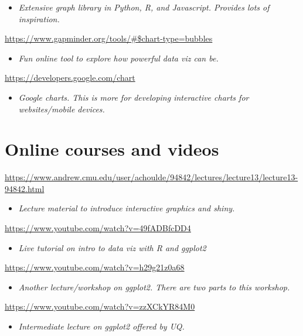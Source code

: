 \documentclass[
]{book}
\providecommand{\tightlist}{%
  \setlength{\itemsep}{0pt}\setlength{\parskip}{0pt}}
\begin{document}
\begin{itemize}
\tightlist
\item
  \emph{Extensive graph library in Python, R, and Javascript. Provides lots of inspiration.}
\end{itemize}

\url{https://www.gapminder.org/tools/\#$chart-type=bubbles}

\begin{itemize}
\tightlist
\item
  \emph{Fun online tool to explore how powerful data viz can be.}
\end{itemize}

\url{https://developers.google.com/chart}

\begin{itemize}
\tightlist
\item
  \emph{Google charts. This is more for developing interactive charts for websites/mobile devices.}
\end{itemize}

\section{Online courses and videos}\label{online-courses-and-videos}

\url{https://www.andrew.cmu.edu/user/achoulde/94842/lectures/lecture13/lecture13-94842.html}

\begin{itemize}
\tightlist
\item
  \emph{Lecture material to introduce interactive graphics and shiny.}
\end{itemize}

\url{https://www.youtube.com/watch?v=49fADBfcDD4}

\begin{itemize}
\tightlist
\item
  \emph{Live tutorial on intro to data viz with R and ggplot2}
\end{itemize}

\url{https://www.youtube.com/watch?v=h29g21z0a68}

\begin{itemize}
\tightlist
\item
  \emph{Another lecture/workshop on ggplot2. There are two parts to this workshop.}
\end{itemize}

\url{https://www.youtube.com/watch?v=zzXCkYR84M0}

\begin{itemize}
\tightlist
\item
  \emph{Intermediate lecture on ggplot2 offered by UQ.}
\end{itemize}
\end{document}
